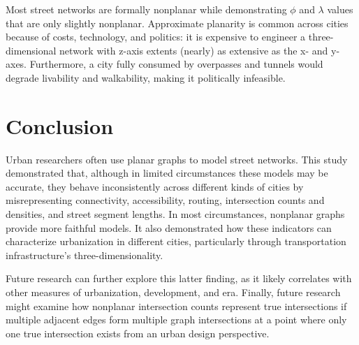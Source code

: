 \documentclass[Afour,sageh,times]{sagej}
\begin{document}
Most street networks are formally nonplanar while demonstrating $\phi$ and $\lambda$ values that are only slightly nonplanar. Approximate planarity is common across cities because of costs, technology, and politics: it is expensive to engineer a three-dimensional network with z-axis extents (nearly) as extensive as the x- and y-axes. Furthermore, a city fully consumed by overpasses and tunnels would degrade livability and walkability, making it politically infeasible.

\section{Conclusion}

Urban researchers often use planar graphs to model street networks. This study demonstrated that, although in limited circumstances these models may be accurate, they behave inconsistently across different kinds of cities by misrepresenting connectivity, accessibility, routing, intersection counts and densities, and street segment lengths. In most circumstances, nonplanar graphs provide more faithful models. It also demonstrated how these indicators can characterize urbanization in different cities, particularly through transportation infrastructure's three-dimensionality.

Future research can further explore this latter finding, as it likely correlates with other measures of urbanization, development, and era. Finally, future research might examine how nonplanar intersection counts represent true intersections if multiple adjacent edges form multiple graph intersections at a point where only one true intersection exists from an urban design perspective.




\end{document}
